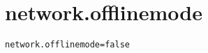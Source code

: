 \section{network.offlinemode}
\label{configuration:NetworkOfflinemode}
\ClearAPI
\TODO
{}
\begin{lstlisting}[style=Props,caption={Usage example for \textit{network.offlinemode}}]
network.offlinemode=false
\end{lstlisting}